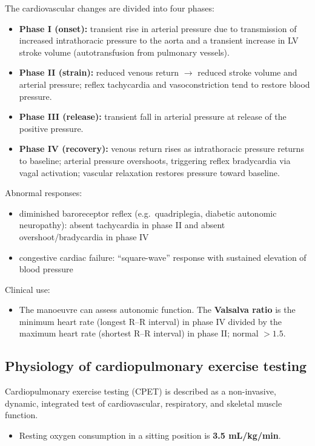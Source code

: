 \documentclass[11pt,a4paper]{article}
\begin{document}
The cardiovascular changes are divided into four phases:
\begin{itemize}
\item \textbf{Phase I (onset):} transient rise in arterial pressure due to transmission of increased intrathoracic pressure to the aorta and a transient increase in LV stroke volume (autotransfusion from pulmonary vessels).
\item \textbf{Phase II (strain):} reduced venous return $\rightarrow$ reduced stroke volume and arterial pressure; reflex tachycardia and vasoconstriction tend to restore blood pressure.
\item \textbf{Phase III (release):} transient fall in arterial pressure at release of the positive pressure.
\item \textbf{Phase IV (recovery):} venous return rises as intrathoracic pressure returns to baseline; arterial pressure overshoots, triggering reflex bradycardia via vagal activation; vascular relaxation restores pressure toward baseline.
\end{itemize}

Abnormal responses:
\begin{itemize}
\item diminished baroreceptor reflex (e.g.\ quadriplegia, diabetic autonomic neuropathy): absent tachycardia in phase II and absent overshoot/bradycardia in phase IV
\item congestive cardiac failure: ``square-wave'' response with sustained elevation of blood pressure
\end{itemize}

Clinical use:
\begin{itemize}
\item The manoeuvre can assess autonomic function. The \textbf{Valsalva ratio} is the minimum heart rate (longest R--R interval) in phase IV divided by the maximum heart rate (shortest R--R interval) in phase II; normal \textbf{$>1.5$}.
\end{itemize}

\subsection{Physiology of cardiopulmonary exercise testing}
Cardiopulmonary exercise testing (CPET) is described as a non-invasive, dynamic, integrated test of cardiovascular, respiratory, and skeletal muscle function.
\begin{itemize}
\item Resting oxygen consumption in a sitting position is \textbf{3.5 mL/kg/min}.
\end{itemize}
\end{document}
